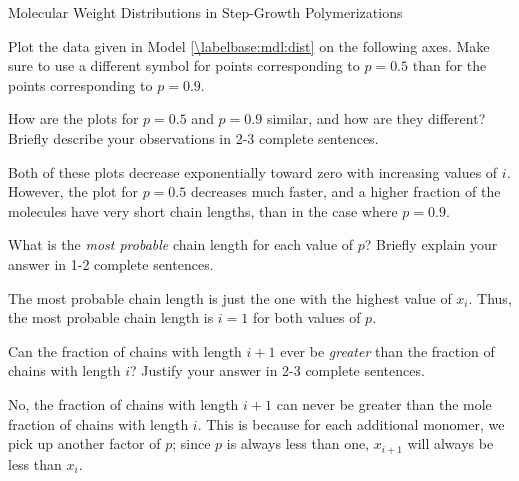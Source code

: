 \begin{activity}{Molecular Weight Distributions in Step-Growth Polymerizations}
\begin{model}
\end{model}
	
\begin{ctqs}

	\question Plot the data given in Model \ref{\labelbase:mdl:dist} on the following axes.  Make sure to use a different symbol for points corresponding to $p=0.5$ than for the points corresponding to $p=0.9$.
	
		\begin{solution}[3.25in]
		\end{solution}
	
	\clearpage
	\question How are the plots for $p=0.5$ and $p=0.9$ similar, and how are they different?  Briefly describe your observations in 2-3 complete sentences.
	
		\begin{solution}[2in]
		
			Both of these plots decrease exponentially toward zero with increasing values of $i$.  However, the plot for $p=0.5$ decreases much faster, and a higher fraction of the molecules have very short chain lengths, than in the case where $p=0.9$.
		\end{solution}
	
	\question What is the \emph{most probable} chain length for each value of $p$?  Briefly explain your answer in 1-2 complete sentences.
	
		\begin{solution}[2in]
		
			The most probable chain length is just the one with the highest value of $x_i$.  Thus, the most probable chain length is $i=1$ for both values of $p$.
		
		\end{solution}
	
	\question Can the fraction of chains with length $i+1$ ever be \emph{greater} than the fraction of chains with length $i$?  Justify your answer in 2-3 complete sentences.
	
		\begin{solution}[1.5in]
		
			No, the fraction of chains with length $i+1$ can never be greater than the mole fraction of chains with length $i$.  This is because for each additional monomer, we pick up another factor of $p$; since $p$ is always less than one, $x_{i+1}$ will always be less than $x_i$.
			

\end{solution}
\end{ctqs}
\end{activity}
